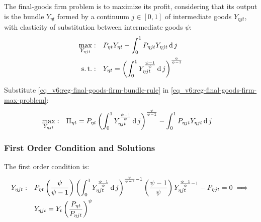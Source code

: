\documentclass[../thesis.tex]{subfiles}
\begin{document}


The final-goods firm problem is to maximize its profit, considering that its output is the bundle $Y_{\eta t}$ formed by a continuum $j \in [0,1]$ of intermediate goods $Y_{\eta jt}$, with elasticity of substitution between intermediate goods $\psi$:
\begin{align}
	\max_{Y_{\eta jt}}: &\quad P_{\eta t} Y_{\eta t} - \int_{0}^{1} P_{\eta jt} Y_{\eta jt} \operatorname{d} j \label{eq_v6:reg-final-goods-firm-max-problem} \\
	\operatorname{s.t.}: & \quad Y_{\eta t} = \left( \int_{0}^{1} Y_{\eta jt}^{\frac{\psi-1}{\psi}} \operatorname{d} j \right)^{\frac{\psi}{\psi-1}} \label{eq_v6:reg-final-goods-firm-bundle-rule}
\end{align}

Substitute \ref{eq_v6:reg-final-goods-firm-bundle-rule} in \ref{eq_v6:reg-final-goods-firm-max-problem}:
\begin{align}
	\label{eq_v6:reg-final-goods-firm-max-problem-2}
	\max_{Y_{\eta jt}}: & \quad \Pi_{\eta t} = P_{\eta t} \left( \int_{0}^{1} Y_{\eta jt}^{\frac{\psi-1}{\psi}} \operatorname{d} j \right)^{\frac{\psi}{\psi-1}} - \int_{0}^{1} P_{\eta jt} Y_{\eta jt} \operatorname{d} j
\end{align}

\subsubsection*{First Order Condition and Solutions}

The first order condition is:
\begin{align}
	Y_{\eta jt}:\quad & P_{\eta t} \left( \frac{\psi}{\psi-1} \right) \left( \int_{0}^{1} Y_{\eta jt}^{\frac{\psi-1}{\psi}} \operatorname{d} j \right)^{\frac{\psi}{\psi-1}-1} \left( \frac{\psi-1}{\psi} \right) Y_{\eta jt}^{\frac{\psi-1}{\psi}-1} - P_{\eta jt} = 0 \implies \nonumber \\
	\label{eq_v6:reg-final-goods-firm-FOC}
	& Y_{\eta jt} = Y_{t} \left( \frac{P_{\eta t}}{P_{\eta jt}} \right)^{\psi}
\end{align}
\end{document}
